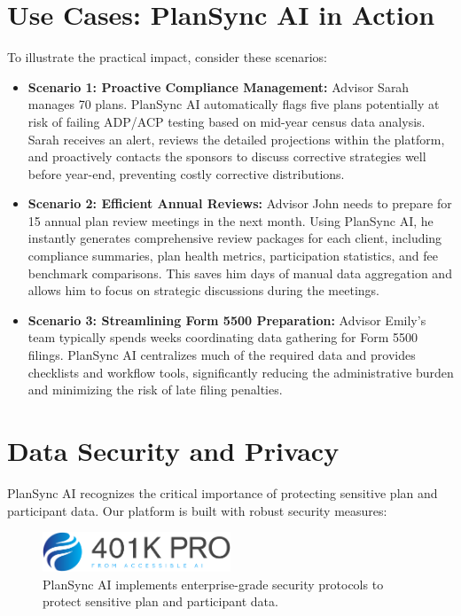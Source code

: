 \documentclass[11pt]{article} %
\begin{document}
\section{Use Cases: PlanSync AI in Action}
To illustrate the practical impact, consider these scenarios:
\begin{itemize}[leftmargin=*]
    \item \textbf{Scenario 1: Proactive Compliance Management:} Advisor Sarah manages 70 plans. PlanSync AI automatically flags five plans potentially at risk of failing ADP/ACP testing based on mid-year census data analysis. Sarah receives an alert, reviews the detailed projections within the platform, and proactively contacts the sponsors to discuss corrective strategies well before year-end, preventing costly corrective distributions.
    \item \textbf{Scenario 2: Efficient Annual Reviews:} Advisor John needs to prepare for 15 annual plan review meetings in the next month. Using PlanSync AI, he instantly generates comprehensive review packages for each client, including compliance summaries, plan health metrics, participation statistics, and fee benchmark comparisons. This saves him days of manual data aggregation and allows him to focus on strategic discussions during the meetings.
    \item \textbf{Scenario 3: Streamlining Form 5500 Preparation:} Advisor Emily's team typically spends weeks coordinating data gathering for Form 5500 filings. PlanSync AI centralizes much of the required data and provides checklists and workflow tools, significantly reducing the administrative burden and minimizing the risk of late filing penalties.
\end{itemize}

\section{Data Security and Privacy}
PlanSync AI recognizes the critical importance of protecting sensitive plan and participant data. Our platform is built with robust security measures:

\begin{figure}[htbp]
    \centering
    \includegraphics[width=0.5\textwidth]{security.png}
    \caption{PlanSync AI implements enterprise-grade security protocols to protect sensitive plan and participant data.}
    \label{fig:security}
\end{figure}
\end{document}
